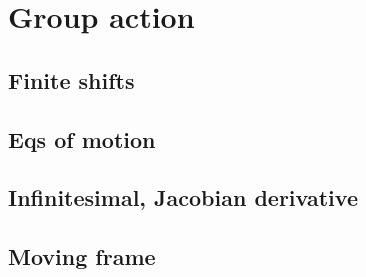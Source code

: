 \subsection{\CLe}


\section{Group action}

\subsection{Finite shifts}

\subsection{Eqs of motion}
\subsection{Infinitesimal, Jacobian derivative}
\subsection{Moving frame}


